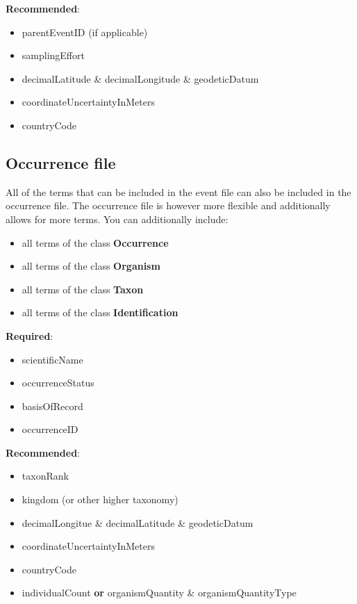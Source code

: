 \documentclass[
]{book}
\providecommand{\tightlist}{%
  \setlength{\itemsep}{0pt}\setlength{\parskip}{0pt}}
\begin{document}
\textbf{Recommended}:

\begin{itemize}
\item
  parentEventID {(if applicable)}
\item
  samplingEffort
\item
  decimalLatitude {\&} decimalLongitude {\&} geodeticDatum
\item
  coordinateUncertaintyInMeters
\item
  countryCode
\end{itemize}

\hypertarget{occurrence-file}{%
\subsection{Occurrence file}\label{occurrence-file}}

All of the terms that can be included in the event file can also be included in the occurrence file. The occurrence file is however more flexible and additionally allows for more terms. You can additionally include:

\begin{itemize}
\tightlist
\item
  all terms of the class \textbf{Occurrence}
\item
  all terms of the class \textbf{Organism}
\item
  all terms of the class \textbf{Taxon}
\item
  all terms of the class \textbf{Identification}
\end{itemize}

\textbf{Required}:

\begin{itemize}
\item
  scientificName
\item
  occurrenceStatus
\item
  basisOfRecord
\item
  occurrenceID
\end{itemize}

\textbf{Recommended}:

\begin{itemize}
\item
  taxonRank
\item
  kingdom {(or other higher taxonomy)}
\item
  decimalLongitue {\&} decimalLatitude {\&} geodeticDatum
\item
  coordinateUncertaintyInMeters
\item
  countryCode
\item
  individualCount {\textbf{or}} organismQuantity {\&} organismQuantityType
\end{itemize}
\end{document}
